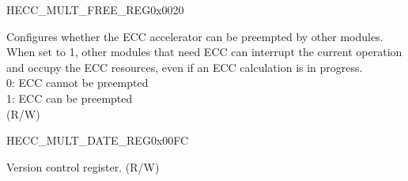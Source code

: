 \begin{register}{H}{ECC\_MULT\_FREE\_REG}{0x0020}\label{regdesc:ECCMULTFREEREG}
%
%
\regnewline%
\begin{regdesc}\begin{reglist}
\label{fielddesc:ECCMULTFREE}\item [ECC\_MULT\_FREE] Configures whether the ECC accelerator can be preempted by other modules. When set to 1, other modules that need ECC can interrupt the current operation and occupy the ECC resources, even if an ECC calculation is in progress.\\
0: ECC cannot be preempted\\
1: ECC can be preempted\\
(R/W)
\end{reglist}\end{regdesc}
\end{register}


\begin{register}{H}{ECC\_MULT\_DATE\_REG}{0x00FC}\label{regdesc:ECCMULTDATEREG}
%
%
\regnewline%
\begin{regdesc}\begin{reglist}
\label{fielddesc:ECCMULTDATE}\item [ECC\_MULT\_DATE] Version control register. (R/W)
\end{reglist}\end{regdesc}
\end{register}
